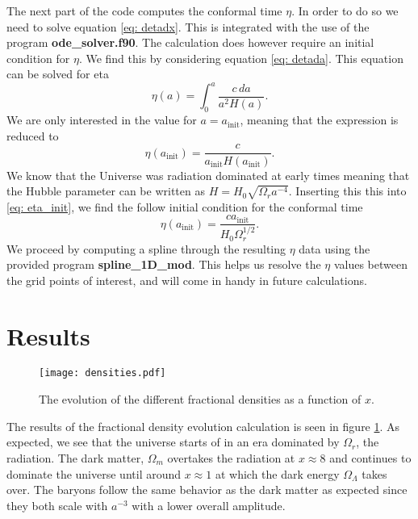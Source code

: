 \documentclass[a4paper, 10pt, reqno]{amsart}
\begin{document}
The next part of the code computes the conformal time $\eta$. In order
to do so we need to solve equation \eqref{eq: detadx}. This is
integrated with the use of the program \textbf{ode\_solver.f90}. The
calculation does however require an initial condition for $\eta$. We
find this by considering equation \eqref{eq: detada}. This equation can
be solved for eta
\begin{equation}
    \eta(a) = \int_0^a \frac{c \, da}{a^2 H(a)}.
\end{equation}
We are only interested in the value for $a = a_\text{init}$, meaning
that the expression is reduced to
\begin{equation}\label{eq: eta_init}
    \eta(a_\text{init}) = \frac{c} {a_\text{init} H(a_\text{init})}.
\end{equation}
We know that the Universe was radiation dominated at early times
meaning that the Hubble parameter can be written as $H = H_0
\sqrt{\Omega_r a^{-4}}$. Inserting this this into \eqref{eq: eta_init},
we find the follow initial condition for the conformal time
\begin{equation}
    \eta(a_\text{init}) = \frac{c a_\text{init}}{H_0 \Omega_r^{1/2}}.
\end{equation}
We proceed by computing a spline through the resulting $\eta$ data
using the provided program \textbf{spline\_1D\_mod}. This helps us
resolve the $\eta$ values between the grid points of interest, and will
come in handy in future calculations.

\section{Results}

\begin{figure}
    \centering
    \texttt{[image: densities.pdf]}
    \caption{The evolution of the different fractional densities as a
    function of $x$.}
    \label{fig: dens}
\end{figure}

The results of the fractional density evolution calculation is seen in
figure \ref{fig: dens}. As expected, we see that the universe starts of
in an era dominated by $\Omega_r$, the radiation. The dark matter,
$\Omega_m$ overtakes the radiation at $x \approx 8$ and continues to
dominate the universe until around $x \approx 1 $ at which the dark
energy $\Omega_\Lambda$ takes over. The baryons follow the same
behavior as the dark matter as expected since they both scale with
$a^{-3}$ with a lower overall amplitude.
\end{document}
